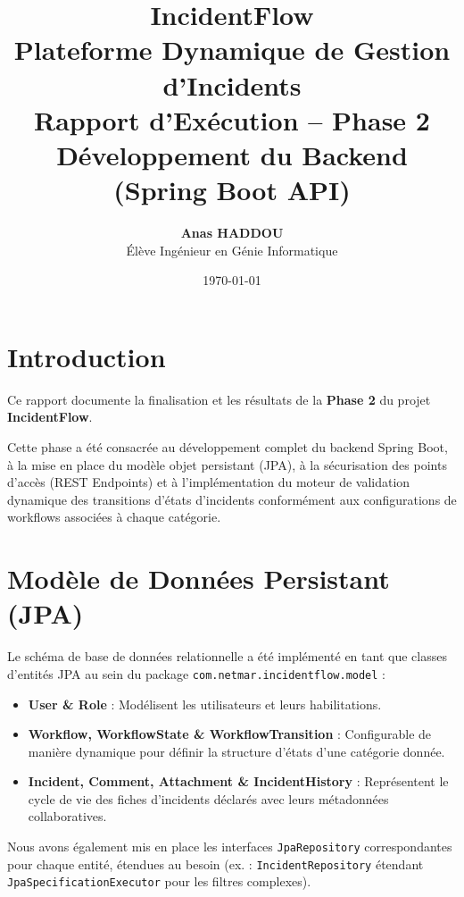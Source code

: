 \documentclass[12pt,a4paper]{article}
\title{
    \vspace{2cm}
    \textbf{\Huge IncidentFlow}\\[0.5cm]
    \Large Plateforme Dynamique de Gestion d'Incidents\\[1.5cm]
    \textbf{\Large Rapport d'Exécution -- Phase 2 \\ Développement du Backend (Spring Boot API)}
    \vspace{1.5cm}
}
\author{\textbf{Anas HADDOU} \\ Élève Ingénieur en Génie Informatique}
\date{\today}
\begin{document}
\maketitle
\thispagestyle{empty}
\clearpage

\tableofcontents
\clearpage

\section{Introduction}
Ce rapport documente la finalisation et les résultats de la \textbf{Phase 2} du projet \textbf{IncidentFlow}. 

Cette phase a été consacrée au développement complet du backend Spring Boot, à la mise en place du modèle objet persistant (JPA), à la sécurisation des points d'accès (REST Endpoints) et à l'implémentation du moteur de validation dynamique des transitions d'états d'incidents conformément aux configurations de workflows associées à chaque catégorie.

\section{Modèle de Données Persistant (JPA)}
Le schéma de base de données relationnelle a été implémenté en tant que classes d'entités JPA au sein du package \texttt{com.netmar.incidentflow.model} :
\begin{itemize}
    \item \textbf{User \& Role} : Modélisent les utilisateurs et leurs habilitations.
    \item \textbf{Workflow, WorkflowState \& WorkflowTransition} : Configurable de manière dynamique pour définir la structure d'états d'une catégorie donnée.
    \item \textbf{Incident, Comment, Attachment \& IncidentHistory} : Représentent le cycle de vie des fiches d'incidents déclarés avec leurs métadonnées collaboratives.
\end{itemize}

Nous avons également mis en place les interfaces \texttt{JpaRepository} correspondantes pour chaque entité, étendues au besoin (ex. : \texttt{IncidentRepository} étendant \texttt{JpaSpecificationExecutor} pour les filtres complexes).

\end{document}
